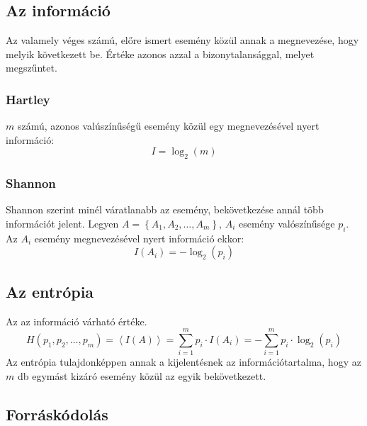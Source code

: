 \documentclass[../main.tex]{subfiles}
\begin{document}
\subsection{Az információ}

Az  valamely véges számú, előre ismert esemény közül annak a
megnevezése, hogy melyik következett be.
Értéke azonos azzal a bizonytalansággal, melyet megszűntet.

\subsubsection*{Hartley}

$m$ számú, azonos valúszínűségű esemény közül
egy megnevezésével nyert információ:
\[
	I = \log_2(m)
\]

\subsubsection*{Shannon}

Shannon szerint minél váratlanabb az esemény, bekövetkezése
annál több információt jelent. Legyen
$A = \left\{ A_1, A_2, \dots, A_m \right\}$,
$A_i$ esemény valószínűsége $p_i$.
Az $A_i$ esemény megnevezésével nyert információ ekkor:
\[
	I \left( A_i \right) = -\log_2 \left( p_i \right)
\]

\subsection{Az entrópia}

Az  az információ várható értéke.
\[
	H(p_1, p_2, \dots, p_m) =
	\left\langle I(A) \right\rangle =
	\sum_{i=1}^m p_i \cdot I \left( A_i \right) =
	- \sum_{i=1}^m p_i \cdot \log_2(p_i)
\]
Az entrópia tulajdonképpen annak a kijelentésnek az információtartalma,
hogy az $m$ db egymást kizáró esemény közül az egyik bekövetkezett.

\subsection{Forráskódolás}
\end{document}
